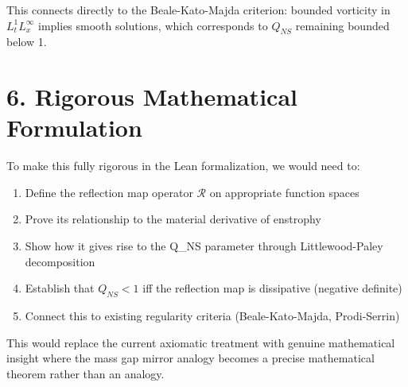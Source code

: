 \documentclass[11pt]{article}
\begin{document}
This connects directly to the Beale-Kato-Majda criterion: bounded vorticity in \(L^1_t L^\infty_x\) implies smooth solutions, which corresponds to \(Q_{NS}\) remaining bounded below 1.

\section{6. Rigorous Mathematical Formulation}

To make this fully rigorous in the Lean formalization, we would need to:

\begin{enumerate}
\item Define the reflection map operator \(\mathcal{R}\) on appropriate function spaces
\item Prove its relationship to the material derivative of enstrophy
\item Show how it gives rise to the Q_{NS} parameter through Littlewood-Paley decomposition
\item Establish that \(Q_{NS} < 1\) iff the reflection map is dissipative (negative definite)
\item Connect this to existing regularity criteria (Beale-Kato-Majda, Prodi-Serrin)
\end{enumerate}

This would replace the current axiomatic treatment with genuine mathematical insight where the mass gap mirror analogy becomes a precise mathematical theorem rather than an analogy.
\end{document}
